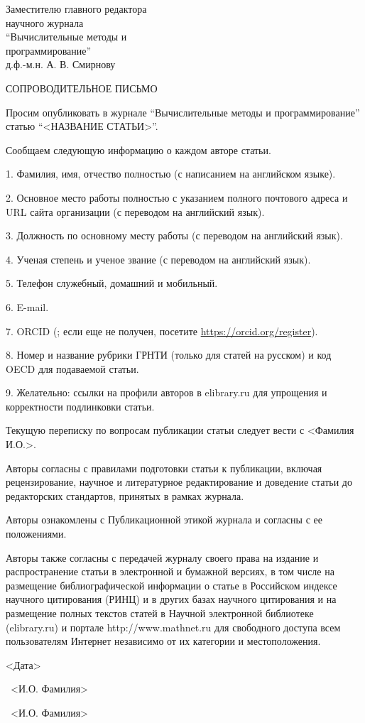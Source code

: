 \documentclass[10pt,a4paper]{book}
\begin{document}
{\large
\hfill\parbox[t]{70mm}{
Заместителю главного редактора\\
научного журнала\\[2mm]
``Вычислительные методы и\\
программирование''\\[2mm]
д.ф.-м.н. А. В. Смирнову
}
\vspace*{12mm}
\begin{center}
СОПРОВОДИТЕЛЬНОЕ ПИСЬМО
\end{center}

\vspace*{3mm}

Просим опубликовать в журнале ``Вычислительные методы и программирование'' статью 
``<НАЗВАНИЕ СТАТЬИ>''.

Сообщаем следующую информацию о каждом авторе статьи.

1. Фамилия, имя, отчество полностью (с написанием на английском языке).

2. Основное место работы полностью с указанием полного почтового адреса и URL сайта организации (с переводом на английский язык).

3. Должность по основному месту работы (с переводом на английский язык).

4. Ученая степень и ученое звание (с переводом на английский язык).

5. Телефон служебный, домашний и мобильный.

6. E-mail.

7. ORCID (; если еще не получен, посетите \url{https://orcid.org/register}).

8. Номер и название рубрики ГРНТИ (только для статей на русском) и код OECD для подаваемой статьи.

9. Желательно: ссылки на профили авторов в elibrary.ru для упрощения и корректности подлинковки статьи.

\vspace*{2mm}
Текущую переписку по вопросам публикации статьи следует вести с <Фамилия И.О.>.

\vspace*{2mm}
Авторы согласны с правилами подготовки статьи к публикации, включая рецензирование, 
научное и литературное редактирование и доведение статьи до редакторских стандартов, 
принятых в рамках журнала.

Авторы ознакомлены с Публикационной этикой журнала и согласны с ее положениями.

Авторы также согласны с передачей журналу своего права на издание и распространение 
статьи в электронной и бумажной версиях, в том числе на размещение библиографической 
информации о статье в Российском индексе научного цитирования (РИНЦ) и в других базах 
научного цитирования и на размещение полных текстов статей в Научной электронной 
библиотеке (elibrary.ru) и портале http://www.mathnet.ru для свободного доступа всем пользователям Интернет независимо от их категории и местоположения.

\vspace*{15mm}
<Дата>\hfill\parbox[t]{70mm}{\hrulefill~<И.О. Фамилия>}

\vspace*{8mm}

\hfill\parbox[t]{70mm}{\hrulefill~<И.О. Фамилия>}

}%
\end{document}
